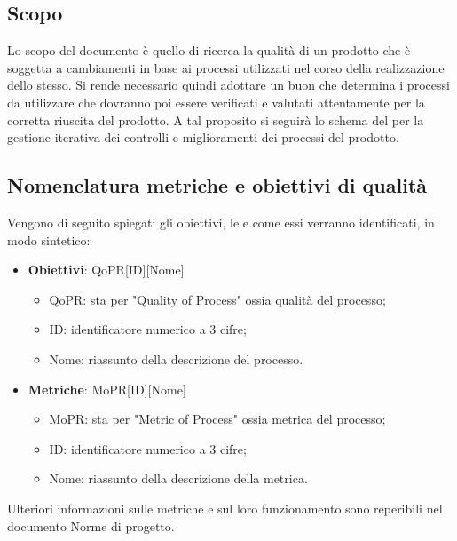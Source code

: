 \documentclass[../piano-di-qualifica.tex]{subfiles}
\begin{document}
\subsection{Scopo}%
\label{sub:scopo}
Lo scopo del documento è quello di ricerca la qualità di un prodotto che è soggetta a cambiamenti in base ai processi utilizzati nel corso della realizzazione dello stesso.
Si rende necessario quindi adottare un buon  che determina i processi da utilizzare che dovranno poi essere verificati e valutati attentamente per la corretta riuscita del prodotto.
A tal proposito si seguirà lo schema del  per la gestione iterativa dei controlli e miglioramenti dei processi del prodotto.

\subsection{Nomenclatura metriche e obiettivi di qualità}%
\label{sub:nomenclatura_metriche_e_obiettivi_di_qualita}
Vengono di seguito spiegati gli obiettivi, le  e come essi verranno identificati, in modo sintetico:
\begin{itemize}
    \item \textbf{Obiettivi}: QoPR[ID][Nome]
        \begin{itemize}
            \item QoPR: sta per "Quality of Process" ossia qualità del processo;
            \item ID: identificatore numerico a 3 cifre;
            \item Nome: riassunto della descrizione del processo.
        \end{itemize}
    \item \textbf{Metriche}: MoPR[ID][Nome]
        \begin{itemize}
            \item MoPR: sta per "Metric of Process" ossia metrica del processo;
            \item ID: identificatore numerico a 3 cifre;
            \item Nome: riassunto della descrizione della metrica.
        \end{itemize}
\end{itemize}  
Ulteriori informazioni sulle metriche e sul loro funzionamento sono reperibili nel documento Norme di progetto.
\end{document}
